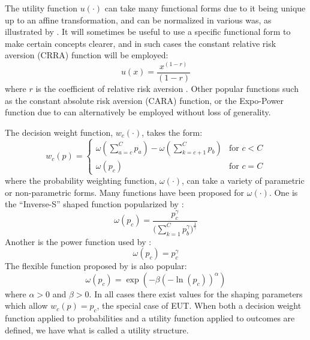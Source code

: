 \documentclass[../main.tex]{subfiles}
\begin{document}
The utility function $u(\cdot)$ can take many functional forms due to it being unique up to an affine transformation, and can be normalized in various was, as illustrated by \textcite{Hey1994}.
It will sometimes be useful to use a specific functional form to make certain concepts clearer, and in such cases the constant relative risk aversion (CRRA) function will be employed:
\begin{equation}
	\label{eq2:CRRA}
	u(x) = \frac{x^{(1-r)}}{(1-r)}
\end{equation}
\noindent where $r$ is the coefficient of relative risk aversion \parencite{Pratt1964}.
Other popular functions such as the constant absolute risk aversion (CARA) function, or the Expo-Power function due to \textcite{Saha1993} can alternatively be employed without loss of generality.

The decision weight function, $w_c(\cdot)$, takes the form:
\begin{equation}
	\label{eq2:dweight}
	w_c(p) =
	\begin{cases}
		\omega\left(\displaystyle\sum_{a=c}^C p_a\right) - \omega\left(\displaystyle\sum_{k=c+1}^C p_b\right) & \text{for } c<C \\
		\omega(p_c) & \text{for } c = C
	\end{cases}
\end{equation}
\noindent where the probability weighting function, $\omega(\cdot)$, can take a variety of parametric or non-parametric forms.
Many functions have been proposed for $\omega(\cdot)$.
One is the \enquote{Inverse-S} shaped function popularized by \textcite{Tversky1992}:
\begin{equation}
	\label{eq2:pw:kahneman}
	\omega(p_c) = \frac{p_c^\gamma}{\biggl(\sum\limits_{k=1}^{C} p_b^\gamma\biggr)^{ \frac{1}{\gamma} } }
\end{equation}
\noindent Another is the power function used by \textcite{Quiggin1982}:
\begin{equation}
	\label{eq2:pw:quiggin}
	\omega(p_c)=p_c^\gamma
\end{equation}
\noindent The flexible function proposed by \textcite{Prelec1998} is also popular:
\begin{equation}
	\label{eq2:pw:prelec}
	\omega(p_c)=\exp(-\beta(-\ln(p_c))^\alpha)
\end{equation}
\noindent where $\alpha > 0$ and $\beta > 0$.
In all cases there exist values for the shaping parameters which allow $w_c(p) = p_c$, the special case of EUT.
When both a decision weight function applied to probabilities and a utility function applied to outcomes are defined, we have what is called a utility structure.
\end{document}
